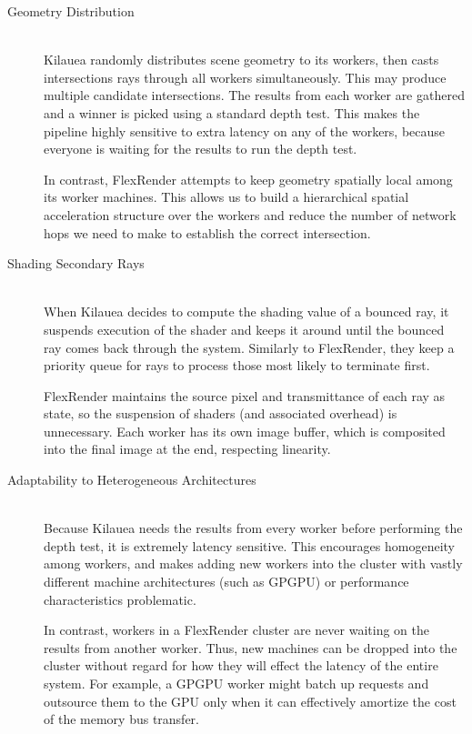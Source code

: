 \documentclass[12pt]{ucthesis}
\begin{document}
\begin{description}
    \item[Geometry Distribution] \hfill \\
        Kilauea randomly distributes scene geometry to
        its workers, then casts intersections rays through all workers
        simultaneously. This may produce multiple candidate intersections. The
        results from each worker are gathered and a winner is picked using a
        standard depth test. This makes the pipeline highly sensitive to extra
        latency on any of the workers, because everyone is waiting for the
        results to run the depth test.

        In contrast, FlexRender attempts to keep geometry spatially local among
        its worker machines. This allows us to build a hierarchical spatial acceleration
        structure over the workers and reduce the number of network hops we need
        to make to establish the correct intersection.
    \item[Shading Secondary Rays] \hfill \\
        When Kilauea decides to compute the shading value of a bounced ray, it
        suspends execution of the shader and keeps it around until the bounced
        ray comes back through the system. Similarly to FlexRender, they keep
        a priority queue for rays to process those most likely to terminate
        first.

        FlexRender maintains the source pixel and transmittance of each ray as
        state, so the suspension of shaders (and associated overhead) is
        unnecessary. Each worker has its own image buffer, which is composited
        into the final image at the end, respecting linearity.
    \item[Adaptability to Heterogeneous Architectures] \hfill \\
        Because Kilauea needs the results from every worker before performing
        the depth test, it is extremely latency sensitive. This encourages
        homogeneity among workers, and makes adding new workers into the cluster
        with vastly different machine architectures (such as GPGPU) or performance
        characteristics problematic.

        In contrast, workers in a FlexRender cluster are never waiting on
        the results from another worker. Thus, new machines can be dropped into the
        cluster without regard for how they will effect the latency of the entire
        system. For example, a GPGPU worker might batch up requests and outsource
        them to the GPU only when it can effectively amortize the cost of the
        memory bus transfer.
\end{description}
\end{document}
